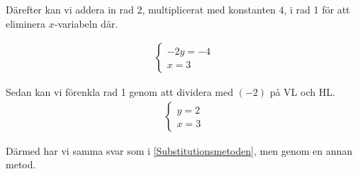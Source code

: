 Därefter kan vi addera in rad 2, multiplicerat med konstanten $4$, i rad 1 för att eliminera $x$-variabeln där.

\begin{align}
	\begin{cases}
		-2y=-4 \\
		x = 3
	\end{cases}
\end{align}

Sedan kan vi förenkla rad 1 genom att dividera med $(-2)$ på VL och HL.
\begin{align}
	\begin{cases}
		y=2 \\
		x = 3
	\end{cases}
\end{align}

Därmed har vi samma svar som i \ref{Substitutionsmetoden}, men genom en annan metod.


























